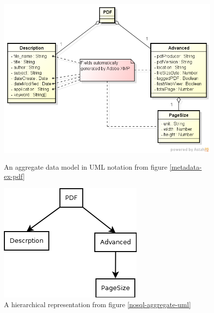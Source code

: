 \begin{figure}[h]
	\centering
	\includegraphics*[scale=0.55]{res/bg-knowledge/nosql-nosql-agregate-uml}
	\caption{An aggregate data model in UML notation from figure \ref{metadata-ex-pdf}}
	\label{nosql-aggregate-uml}
	
	\includegraphics*[scale=0.6]{res/bg-knowledge/nosql-uml-hiarch-repr}
	\caption{A hierarchical representation from figure \ref{nosql-aggregate-uml}}
	\label{nosql-uml-hiarch-repr}	
\end{figure}

